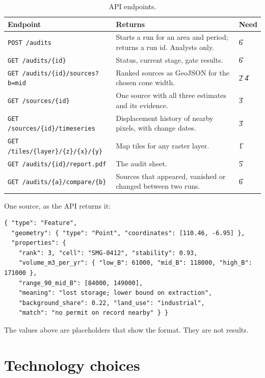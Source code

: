 {\small
\begin{xltabular}{\linewidth}{@{}L{58mm}Y L{12mm}@{}}
\caption{API endpoints.}\label{tab:api}\\*
\toprule
\textbf{Endpoint} & \textbf{Returns} & \textbf{Need}\\*
\midrule
\texttt{POST /audits} & Starts a run for an area and period; returns a run id. Analysts only. & \U{6}\\
\texttt{GET /audits/\{id\}} & Status, current stage, gate results. & \U{6}\\
\texttt{GET /audits/\{id\}/sources?b=mid} & Ranked sources as GeoJSON for the chosen cone width. & \U{2} \U{4}\\
\texttt{GET /sources/\{id\}} & One source with all three estimates and its evidence. & \U{3}\\
\texttt{GET /sources/\{id\}/timeseries} & Displacement history of nearby pixels, with change dates. & \U{3}\\
\texttt{GET /tiles/\{layer\}/\{z\}/\{x\}/\{y\}} & Map tiles for any raster layer. & \U{1}\\
\texttt{GET /audits/\{id\}/report.pdf} & The audit sheet. & \U{5}\\
\texttt{GET /audits/\{a\}/compare/\{b\}} & Sources that appeared, vanished or changed between two runs. & \U{6}\\
\bottomrule
\end{xltabular}}

One source, as the API returns it:

{\small
\begin{verbatim}
{ "type": "Feature",
  "geometry": { "type": "Point", "coordinates": [110.46, -6.95] },
  "properties": {
    "rank": 3, "cell": "SMG-0412", "stability": 0.93,
    "volume_m3_per_yr": { "low_B": 61000, "mid_B": 118000, "high_B": 171000 },
    "range_90_mid_B": [84000, 149000],
    "meaning": "lost storage; lower bound on extraction",
    "background_share": 0.22, "land_use": "industrial",
    "match": "no permit on record nearby" } }
\end{verbatim}
}
The values above are placeholders that show the format. They are not results.

\section{Technology choices}

